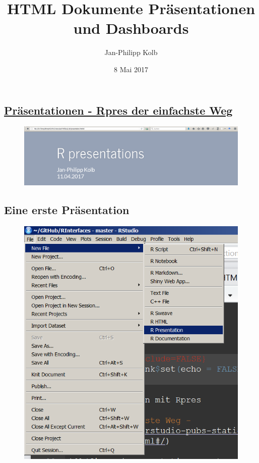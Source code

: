 \documentclass[]{article}
\title{HTML Dokumente Präsentationen und Dashboards}
\author{Jan-Philipp Kolb}
\date{8 Mai 2017}
\begin{document}
\maketitle

\subsection{\texorpdfstring{\href{https://rstudio-pubs-static.s3.amazonaws.com/27777_55697c3a476640caa0ad2099fe914ae5.html\#/}{\textbf{Präsentationen
- Rpres der einfachste
Weg}}}{Präsentationen - Rpres der einfachste Weg}}\label{prasentationen---rpres-der-einfachste-weg}

\begin{figure}
\centering
\includegraphics{figure/Rpresentations.PNG}
\caption{}
\end{figure}

\subsection{Eine erste Präsentation}\label{eine-erste-prasentation}

\begin{figure}
\centering
\includegraphics{figure/RpresStart.PNG}
\caption{}
\end{figure}
\end{document}
